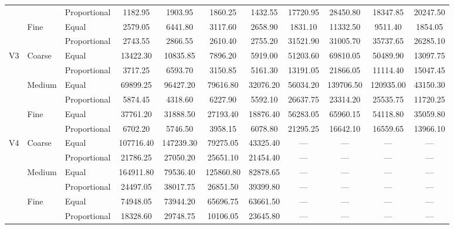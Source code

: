 \documentclass[10pt,journal,compsoc]{IEEEtran}
\begin{document}
\begin{table}
\begin{tabular}{|c|l|l|c|c|c|c|c|c|c|c|}
	& 	& Proportional	& 1182.95	& 1903.95	& 1860.25	& 1432.55	& 17720.95	& 28450.80	& 18347.85	& 20247.50	 \\ \cline{2-11}
	& Fine	& Equal	& 2579.05	& 6441.80	& 3117.60	& 2658.90	& 1831.10	& 11332.50	& 9511.40	& 1854.05	 \\ \cline{3-11}
	& 	& Proportional	& 2743.55	& 2866.55	& 2610.40	& 2755.20	& 31521.90	& 31005.70	& 35737.65	& 26285.10	 \\ \hline
V3	& Coarse	& Equal	& 13422.30	& 10835.85	& 7896.20	& 5919.00	& 51203.60	& 69810.05	& 50489.90	& 13097.75	 \\ \cline{3-11}
	& 	& Proportional	& 3717.25	& 6593.70	& 3150.85	& 5161.30	& 13191.05	& 21866.05	& 11114.40	& 15047.45	 \\ \cline{2-11}
	& Medium	& Equal	& 69899.25	& 96427.20	& 79616.80	& 32076.20	& 56034.20	& 139706.50	& 120935.00	& 43150.30	 \\ \cline{3-11}
	& 	& Proportional	& 5874.45	& 4318.60	& 6227.90	& 5592.10	& 26637.75	& 23314.20	& 25535.75	& 11720.25	 \\ \cline{2-11}
	& Fine	& Equal	& 37761.20	& 31888.50	& 27193.40	& 18876.40	& 56283.05	& 65960.15	& 54118.80	& 35059.80	 \\ \cline{3-11}
	& 	& Proportional	& 6702.20	& 5746.50	& 3958.15	& 6078.80	& 21295.25	& 16642.10	& 16559.65	& 13966.10	 \\ \hline
V4	& Coarse	& Equal	& 107716.40	& 147239.30	& 79275.05	& 43325.40	& ---	& ---	& ---	& ---	 \\ \cline{3-11}
	& 	& Proportional	& 21786.25	& 27050.20	& 25651.10	& 21454.40	& ---	& ---	& ---	& ---	 \\ \cline{2-11}
	& Medium	& Equal	& 164911.80	& 79536.40	& 125860.80	& 82878.65	& ---	& ---	& ---	& ---	 \\ \cline{3-11}
	& 	& Proportional	& 24497.05	& 38017.75	& 26851.50	& 39399.80	& ---	& ---	& ---	& ---	 \\ \cline{2-11}
	& Fine	& Equal	& 74948.05	& 73944.20	& 65696.75	& 63661.50	& ---	& ---	& ---	& ---	 \\ \cline{3-11}
	& 	& Proportional	& 18328.60	& 29748.75	& 10106.05	& 23645.80	& ---	& ---	& ---	& ---	 \\ \hline
\end{tabular}
\end{table}
\end{document}
